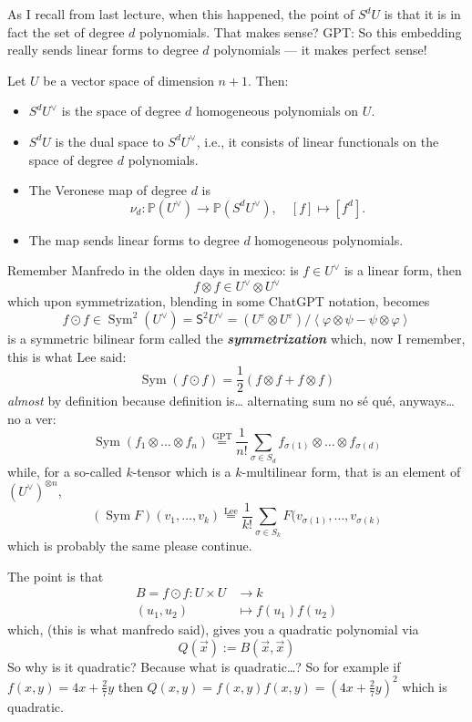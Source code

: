 \begin{remark}\leavevmode
As I recall from last lecture, when this happened, the point of \(S^dU\) is that it is in fact the set of degree \(d\) polynomials. That makes sense? GPT: So this embedding really sends linear forms to degree \( d \) polynomials — it makes perfect sense!
\end{remark}

Let \( U \) be a vector space of dimension \( n+1 \). Then:

\begin{itemize}
  \item \( S^d U^\vee \) is the space of degree \( d \) homogeneous polynomials on \( U \).
  \item \( S^d U \) is the dual space to \( S^d U^\vee \), i.e., it consists of linear functionals on the space of degree \( d \) polynomials.
  \item The Veronese map of degree \( d \) is
  \[
    \nu_d : \mathbb{P}(U^\vee) \longrightarrow \mathbb{P}(S^d U^\vee), \quad [f] \mapsto [f^d].
  \]
  \item The map sends linear forms to degree \( d \) homogeneous polynomials.
\end{itemize}

Remember Manfredo in the olden days in mexico: is \(f \in U^\vee\) is a linear form, then
\[f \otimes f \in U^\vee \otimes U^\vee\]
which upon symmetrization, blending in some ChatGPT notation, becomes
\[f \odot f\in \operatorname{Sym}^2(U^\vee)=\mathsf{S}^2U^\vee=(U^\varepsilon \otimes U^\varepsilon)/\left<\varphi \otimes \psi - \psi \otimes \varphi\right>\]
is a symmetric bilinear form called the \textit{\textbf{symmetrization}} which, now I remember, this is what Lee said:
\[\operatorname{Sym}(f  \odot f)=\frac{1}{2}(f\otimes f + f \otimes f)\]
\textit{almost} by definition because definition is… alternating sum no sé qué, anyways… no a ver:
\[\operatorname{Sym}(f_1 \otimes \ldots \otimes f_n)\overset{\text{GPT} }{=}\frac{1}{n!}\sum_{\sigma \in S_d}f_{\sigma(1)}\otimes \ldots \otimes f_{\sigma(d)}\]
while, for a so-called \(k\)-tensor which is a  \(k\)-multilinear form, that is an element of \((U^{\vee})^{\otimes n}\),
\[(\operatorname{Sym}F)(v_1,\ldots,v_k)\overset{\text{Lee} }{=}\frac{1}{k!}\sum_{\sigma \in S_k}F(v_{\sigma(1)},\ldots,v_{\sigma(k)}\]
which is probably the same please continue.

The point is that
\begin{align*}
	B=f \odot f: U \times U &\longrightarrow k \\
	(u_1,u_2)&\longmapsto f(u_1)f(u_2)
\end{align*}
which, (this is what manfredo said), gives you a quadratic polynomial via
\[Q(\vec{x}):=B(\vec{x},\vec{x})\]
So why is it quadratic? Because what is quadratic…? So for example if \(f(x,y)=4x+\frac{2}{7}y\) then \(Q(x,y)=f(x,y)f(x,y)=(4x+\frac{2}{7}y)^2\) which is quadratic.

